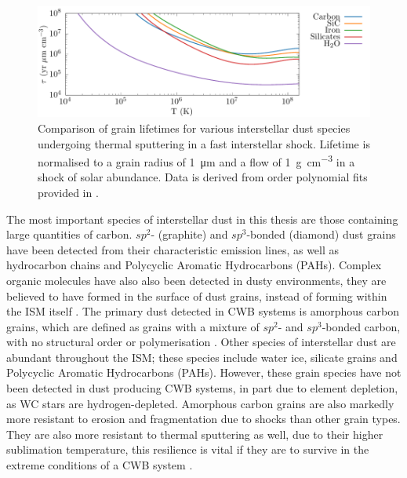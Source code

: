 \begin{figure}
  \centering
  \includegraphics{assets/tielens-sputtering/sputter.pdf}
  \caption[Grain lifetime comparison]{Comparison of grain lifetimes for various interstellar dust species undergoing thermal sputtering in a fast interstellar shock. Lifetime is normalised to a grain radius of \SI{1}{\micro\metre} and a flow of \SI{1}{\gram\per\centi\metre\cubed} in a shock of solar abundance. Data is derived from  order polynomial fits provided in \textcite[Table~4]{tielens_physics_1994}.}
  \label{fig:grain-lifespan}
\end{figure}


\parencite{draineDestructionMechanismsInterstellar1979}


The most important species of interstellar dust in this thesis are those containing large quantities of carbon.
$sp^2$- (graphite) and $sp^3$-bonded (diamond) dust grains have been detected from their characteristic emission lines, as well as hydrocarbon chains and Polycyclic Aromatic Hydrocarbons (PAHs).
Complex organic molecules have also also been detected in dusty environments, they are believed to have formed in the surface of dust grains, instead of forming within the ISM itself
\parencite{herbstComplexOrganicInterstellar2009}.
The primary dust detected in CWB systems is amorphous carbon grains, which are defined as grains with a mixture of $sp^2$- and $sp^3$-bonded carbon, with no structural order or polymerisation
\parencite{draine_interstellar_2003}.
Other species of interstellar dust are abundant throughout the ISM; these species include water ice, silicate grains and Polycyclic Aromatic Hydrocarbons (PAHs).
However, these grain species have not been detected in dust producing CWB systems, in part due to element depletion, as WC stars are hydrogen-depleted.
Amorphous carbon grains are also markedly more resistant to erosion and fragmentation due to shocks than other grain types.
They are also more resistant to thermal sputtering as well, due to their higher sublimation temperature, this resilience is vital if they are to survive in the extreme conditions of a CWB system
\parencite{draineDestructionMechanismsInterstellar1979}.


